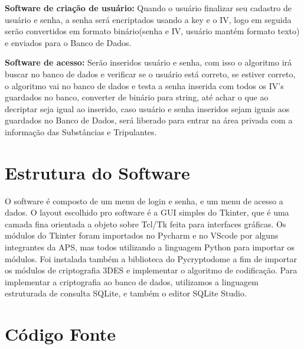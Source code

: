 \par\textbf {Software de criação de usuário:} Quando o usuário finalizar seu cadastro de usuário e senha, a senha será encriptados usando a key e o IV, logo em seguida serão convertidos em formato binário(senha e IV, usuário mantém formato texto) e enviados para o Banco de Dados.

\par\textbf {Software de acesso:} Serão inseridos usuário e senha, com isso o algoritmo irá buscar no banco de dados e verificar se o usuário está correto, se estiver correto, o algoritmo vai no banco de dados e testa a senha inserida com todos os IV's guardados no banco, converter de binário para string, até achar o que ao decriptar seja igual ao inserido, caso usuário e senha inseridos sejam iguais aos guardados no Banco de Dados, será liberado para entrar na área privada com a informação das Substâncias e Tripulantes.

\newpage
\chapter{\textbf{Estrutura do Software}}

\par O software é composto de um menu de login e senha, e um menu de acesso a dados. O layout escolhido pro software é a GUI simples do Tkinter, que é uma camada fina orientada a objeto sobre Tcl/Tk feita para interfaces gráficas. Os módulos do Tkinter foram importados no Pycharm e no VScode por alguns integrantes da APS, mas todos utilizando a linguagem Python para importar os módulos. Foi instalada também a biblioteca do Pycryptodome a fim de  importar os módulos de criptografia 3DES e implementar o algoritmo de codificação. Para implementar a criptografia ao banco de dados, utilizamos a linguagem estruturada de consulta SQLite, e também o editor SQLite Studio.

\newpage
\chapter{\textbf{Código Fonte}}
\renewcommand\lstlistingname{\textbf{Arquivo}}


\newpage

\newpage

\newpage






